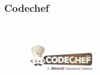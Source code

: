 \documentclass{beamer}
\begin{document}
\begin{frame}
\end{frame}


\begin{frame}
	\frametitle{Codechef }
	\begin{figure}[t]
		\href{https://www.codechef.com/getting-started}{\includegraphics[width=3cm,height=3cm,keepaspectratio]{images/judges/codechef}}
	\end{figure}
	

\end{frame}
\end{document}
